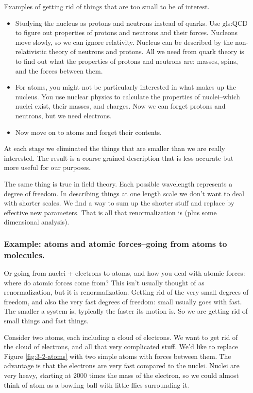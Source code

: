 \documentclass[]{article}
\begin{document}
Examples of getting rid of things that are too small to be of interest.
\begin{itemize}
	\item Studying the nucleus as protons and neutrons instead of quarks. Use \gls{gls:QCD} to figure out properties of protons and neutrons and their forces. Nucleons move slowly, so we can ignore relativity. Nucleus can be described by the non-relativistic theory of neutrons and protons. All we need from quark theory is to find out what the properties of protons and neutrons are: masses, spins, and the forces between them.
	\item For atoms, you might not be particularly interested in what makes up the nucleus. You use nuclear physics to calculate the properties of nuclei--which nuclei exist, their masses, and charges. Now we can forget protons and neutrons, but we need electrons.
	\item Now move on to atoms and forget their contents.
\end{itemize}

At each stage we eliminated the things that are smaller than we are really interested. The result is a coarse-grained description that is less accurate but more useful for our purposes.

The same thing is true in field theory. Each possible wavelength represents a degree of freedom. In describing things at one length scale we don't want to deal with shorter scales. We find a way to sum up the shorter stuff and replace by effective new parameters. That is all that renormalization is (plus some dimensional analysis).

\subsubsection{Example: atoms and atomic forces--going from atoms to molecules.}

Or going from nuclei + electrons to atoms, and how you deal with atomic forces: where do atomic forces come from? This isn't usually thought of as renormalization, but it is renormalization. Getting rid of the very small degrees of freedom, and also the very fast degrees of freedom: small usually goes with fast. The smaller a system is, typically the faster its motion is. So we are getting rid of small things and fast things.

Consider two atoms, each including a cloud of electrons. We want to get rid of the cloud of electrons, and all that very complicated stuff. We'd like to replace Figure \ref{fig:3-2-atoms} with two simple atoms with forces between them. The advantage is that the electrons are very fast compared to the nuclei. Nuclei are very heavy, starting at 2000 times the mass of the electron, so we could almost think of atom as a bowling ball with little flies surrounding it.
\end{document}

